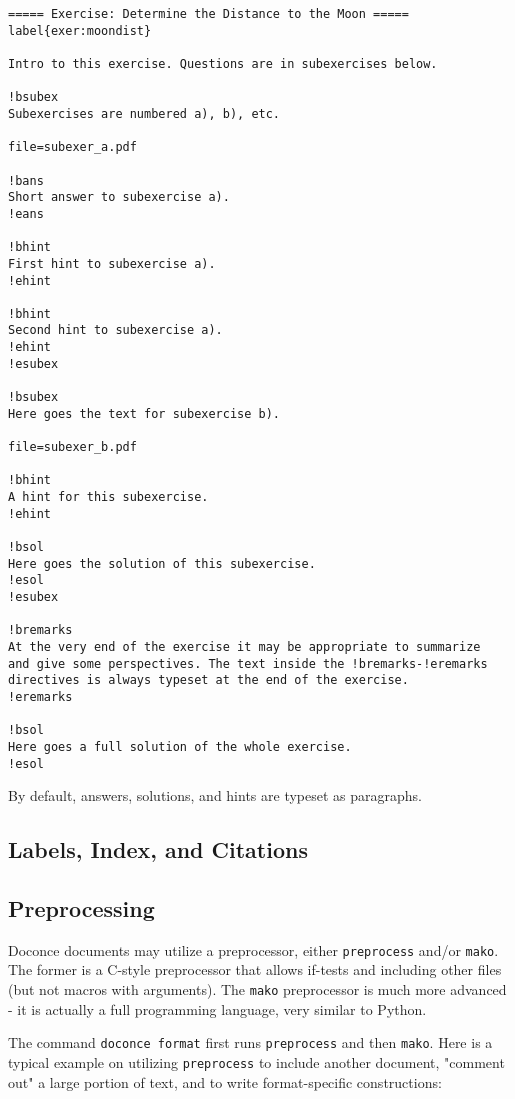 \documentclass[%
oneside,                 %
final,                   %
10pt]{article}
\begin{document}
\begin{Verbatim}[numbers=none,fontsize=\fontsize{9pt}{9pt},baselinestretch=0.85,xleftmargin=0mm]
===== Exercise: Determine the Distance to the Moon =====
label{exer:moondist}

Intro to this exercise. Questions are in subexercises below.

!bsubex
Subexercises are numbered a), b), etc.

file=subexer_a.pdf

!bans
Short answer to subexercise a).
!eans

!bhint
First hint to subexercise a).
!ehint

!bhint
Second hint to subexercise a).
!ehint
!esubex

!bsubex
Here goes the text for subexercise b).

file=subexer_b.pdf

!bhint
A hint for this subexercise.
!ehint

!bsol
Here goes the solution of this subexercise.
!esol
!esubex

!bremarks
At the very end of the exercise it may be appropriate to summarize
and give some perspectives. The text inside the !bremarks-!eremarks
directives is always typeset at the end of the exercise.
!eremarks

!bsol
Here goes a full solution of the whole exercise.
!esol

\end{Verbatim}
By default, answers, solutions, and hints are typeset as paragraphs.

\subsection{Labels, Index, and Citations}

\subsection{Preprocessing}

Doconce documents may utilize a preprocessor, either \Verb!preprocess! and/or
\Verb!mako!. The former is a C-style preprocessor that allows if-tests
and including other files (but not macros with arguments).
The \Verb!mako! preprocessor is much more advanced - it is actually a full
programming language, very similar to Python.

The command \Verb!doconce format! first runs \Verb!preprocess! and then \Verb!mako!.
Here is a typical example on utilizing \Verb!preprocess! to include another
document, "comment out" a large portion of text, and to write format-specific
constructions:
\end{document}
